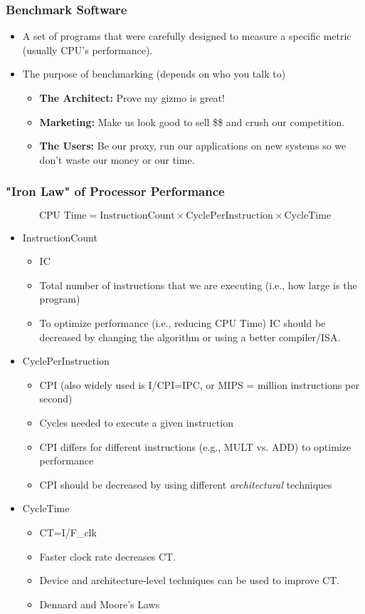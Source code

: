 \documentclass[10pt]{article}
\begin{document}
\subsubsection*{Benchmark Software}
\begin{itemize}
    \item A set of programs that were carefully designed to measure a specific metric (usually CPU's performance).
    \item The purpose of benchmarking (depends on who you talk to)
    \begin{itemize}
        \item \textbf{The Architect:} Prove my gizmo is great!
        \item \textbf{Marketing:} Make us look good to sell \$\$ and crush our competition.
        \item \textbf{The Users:} Be our proxy, run our applications on new systems so we don't waste our money or our time.
    \end{itemize}
\end{itemize}

\subsubsection*{"Iron Law" of Processor Performance}
\[\text{CPU Time} = \text{InstructionCount} \times \text{CyclePerInstruction} \times \text{CycleTime}\]
\begin{itemize}
    \item InstructionCount
    \begin{itemize}
        \item IC
        \item Total number of instructions that we are executing (i.e., how large is the program)
        \item To optimize performance (i.e., reducing CPU Time) IC should be decreased by changing the algorithm or using a better compiler/ISA.
    \end{itemize}
    \item CyclePerInstruction
    \begin{itemize}
        \item CPI (also widely used is I/CPI=IPC, or MIPS = million instructions per second)
        \item Cycles needed to execute a given instruction
        \item CPI differs for different instructions (e.g., MULT vs. ADD) to optimize performance
        \item CPI should be decreased by using different \textit{architectural} techniques
    \end{itemize}
    \item CycleTime
    \begin{itemize}
        \item CT=I/F\_clk
        \item Faster clock rate decreases CT.
        \item Device and architecture-level techniques can be used to improve CT.
        \item Dennard and Moore's Laws
    \end{itemize}
\end{itemize}
\end{document}
